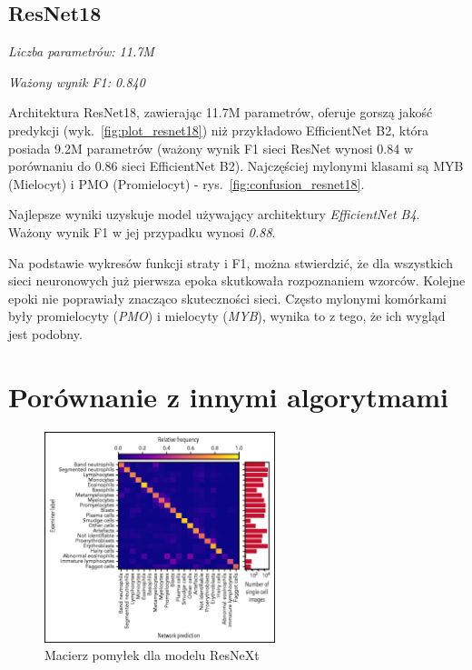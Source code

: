 \subsection{ResNet18}
\textit{Liczba parametrów: 11.7M}

\textit{Ważony wynik F1: 0.840}

Architektura ResNet18, zawierając 11.7M parametrów, oferuje gorszą jakość predykcji (wyk.~\ref{fig:plot_resnet18}) niż przykładowo EfficientNet B2, która posiada 9.2M parametrów (ważony wynik F1 sieci ResNet wynosi 0.84 w porównaniu do 0.86 sieci EfficientNet B2).
Najczęściej mylonymi klasami są MYB (Mielocyt) i PMO (Promielocyt) - rys.~\ref{fig:confusion_resnet18}.

\newline
\newline
\newline

Najlepsze wyniki uzyskuje model używający architektury \textit{EfficientNet B4}.
Ważony wynik F1 w jej przypadku wynosi \textit{0.88}.

Na podstawie wykresów funkcji straty i F1, można stwierdzić, że dla wszystkich sieci neuronowych już pierwsza epoka skutkowała rozpoznaniem wzorców.
Kolejne epoki nie poprawiały znacząco skuteczności sieci.
Często mylonymi komórkami były promielocyty (\textit{PMO}) i mielocyty (\textit{MYB}), wynika to z tego, że ich wygląd jest podobny.


\section{Porównanie z innymi algorytmami}

\begin{figure}
    \centering
    \includegraphics[width=0.6\textwidth]{images/resnext_confusion_matrix}
    \caption{Macierz pomyłek dla modelu ResNeXt \cite{resnext}}
    \label{fig:resnext_confusion_matrix}
\end{figure}

